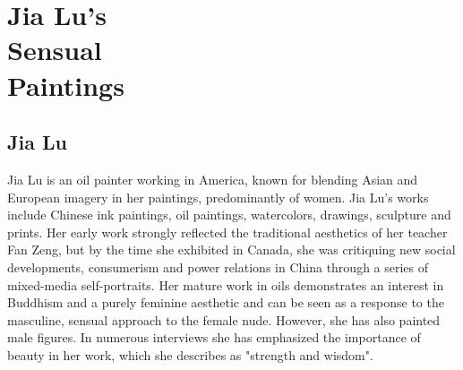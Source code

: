 \newpage


\chapter[swords]{Jia Lu's\\Sensual\\Paintings}

\restoregeometry

\section{Jia Lu}

Jia Lu is an oil painter working in America, known for blending Asian and European imagery in her paintings, predominantly of women. Jia Lu's works include Chinese ink paintings, oil paintings, watercolors, drawings, sculpture and prints. Her early work strongly reflected the traditional aesthetics of her teacher Fan Zeng, but by the time she exhibited in Canada, she was critiquing new social developments, consumerism and power relations in China through a series of mixed-media self-portraits. Her mature work in oils demonstrates an interest in Buddhism and a purely feminine aesthetic and can be seen as a response to the masculine, sensual approach to the female nude. However, she has also painted male figures. In numerous interviews she has emphasized the importance of beauty in her work, which she describes as "strength and wisdom".

\makeatletter
\@specialfalse










